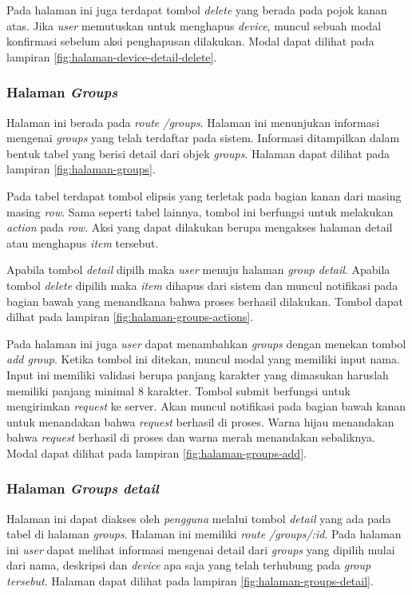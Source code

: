 Pada halaman ini juga terdapat tombol \textit{delete} yang berada pada pojok kanan atas. Jika \textit{user} memutuskan untuk menghapus \textit{device}, muncul sebuah modal konfirmasi sebelum aksi penghapusan dilakukan. Modal dapat dilihat pada lampiran \ref{fig:halaman-device-detail-delete}.

\subsubsection{Halaman \textit{Groups}}
Halaman ini berada pada \textit{route /groups}. Halaman ini menunjukan informasi mengenai \textit{groups} yang telah terdaftar pada sistem. Informasi ditampilkan dalam bentuk tabel yang berisi detail dari objek \textit{groups}. Halaman dapat dilihat pada lampiran \ref{fig:halaman-groups}.

Pada tabel terdapat tombol elipsis yang terletak pada bagian kanan dari masing masing \textit{row}. Sama seperti tabel lainnya, tombol ini berfungsi untuk melakukan \textit{action} pada \textit{row}. Aksi yang dapat dilakukan berupa mengakses halaman detail atau menghapus \textit{item} tersebut.

Apabila tombol \textit{detail} dipilh maka \textit{user} menuju halaman \textit{group detail}. Apabila tombol \textit{delete} dipilih maka \textit{item} dihapus dari sistem dan muncul notifikasi pada bagian bawah yang menandkana bahwa proses berhasil dilakukan. Tombol dapat dilhat pada lampiran \ref{fig:halaman-groups-actions}.

Pada halaman ini juga \textit{user} dapat menambahkan \textit{groups} dengan menekan tombol \textit{add group}. Ketika tombol ini ditekan, muncul modal yang memiliki input nama. Input ini memiliki validasi berupa panjang karakter yang dimasukan haruslah memiliki panjang minimal 8 karakter. Tombol submit berfungsi untuk mengirimkan \textit{request} ke server. Akan muncul notifikasi pada bagian bawah kanan untuk menandakan bahwa \textit{request} berhasil di proses. Warna hijau menandakan bahwa \textit{request} berhasil di proses dan warna merah menandakan sebaliknya. Modal dapat dilihat pada lampiran \ref{fig:halaman-groups-add}.

\subsubsection{Halaman \textit{Groups detail}}
Halaman ini dapat diakses oleh \textit{pengguna} melalui tombol \textit{detail} yang ada pada tabel di halaman \textit{groups}. Halaman ini memiliki \textit{route /groups/:id}. Pada halaman ini \textit{user} dapat melihat informasi mengenai detail dari \textit{groups} yang dipilih mulai dari nama, deskripsi dan \textit{device} apa saja yang telah terhubung pada \textit{group tersebut}. Halaman dapat dilihat pada lampiran \ref{fig:halaman-groups-detail}.

